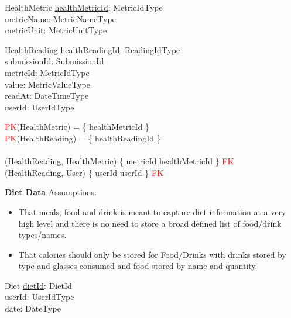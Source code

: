 \documentclass{article}
\begin{document}
\begin{schema}{HealthMetric}
\underline{healthMetricId}: MetricIdType \\
metricName: MetricNameType \\ 
metricUnit: MetricUnitType \\ 
\end{schema}

\begin{schema}{HealthReading}
	\underline{healthReadingId}: ReadingIdType \\
    submissionId: SubmissionId \\
    metricId: MetricIdType \\
    value: MetricValueType \\
    readAt: DateTimeType \\
    userId: UserIdType \\
\end{schema}
\begin{zed}
\textcolor{red}{PK}(HealthMetric) = \{ healthMetricId \} \\
\textcolor{red}{PK}(HealthReading) = \{ healthReadingId \} \\ 
\newline \\ 
(HealthReading, HealthMetric) \mapsto \{ metricId \mapsto healthMetricId \} \in \textcolor{red}{FK} \\
(HealthReading, User) \mapsto \{ userId \mapsto userId \} \in \textcolor{red}{FK} \\
\end{zed}
    
\hspace{-0.5cm}\textbf{Diet Data}
\newline \newline Assumptions:
\begin{itemize}
  \item That meals, food and drink is meant to capture diet information at a very high level and there is no need to store a broad defined list of food/drink types/names. 
  \item That calories should only be stored for Food/Drinks with drinks stored by type and glasses consumed and food stored by name and quantity.
\end{itemize}

\begin{schema}{Diet}
    \underline{dietId}: DietId \\
    userId: UserIdType \\
    date: DateType \\
\end{schema}
\end{document}
